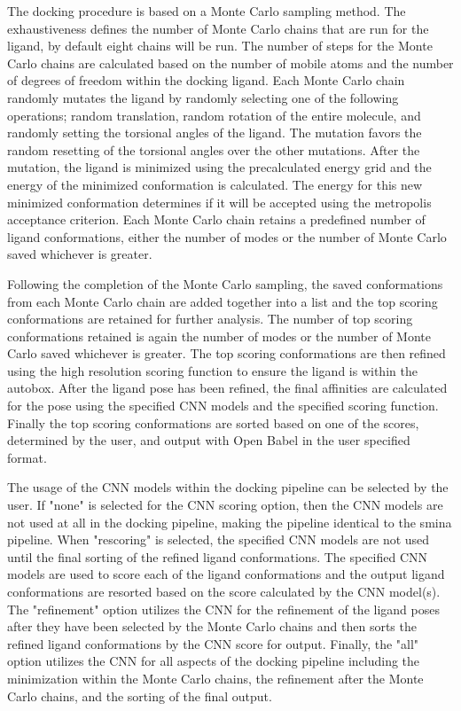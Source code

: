 \documentclass[journal=jcisd8,manuscript=article]{achemso}
\begin{document}
The docking procedure is based on a Monte Carlo sampling method. The exhaustiveness defines the number of Monte Carlo chains that are run for the ligand, by default eight chains will be run. The number of steps for the Monte Carlo chains are calculated based on the number of mobile atoms and the number of degrees of freedom within the docking ligand. Each Monte Carlo chain randomly mutates the ligand by randomly selecting one of the following operations; random translation, random rotation of the entire molecule, and randomly setting the torsional angles of the ligand. The mutation favors the random resetting of the torsional angles over the other mutations. After the mutation, the ligand is minimized using the precalculated energy grid and the energy of the minimized conformation is calculated. The energy for this new minimized conformation determines if it will be accepted using the metropolis acceptance criterion. Each Monte Carlo chain retains a predefined number of ligand conformations, either the number of modes or the number of Monte Carlo saved whichever is greater.

Following the completion of the Monte Carlo sampling, the saved conformations from each Monte Carlo chain are added together into a list and the top scoring conformations are retained for further analysis. The number of top scoring conformations retained is again the number of modes or the number of Monte Carlo saved whichever is greater. The top scoring conformations are then refined using the high resolution scoring function to ensure the ligand is within the autobox. After the ligand pose has been refined, the final affinities are calculated for the pose using the specified CNN models and the specified scoring function. Finally the top scoring conformations are sorted based on one of the scores, determined by the user, and output with Open Babel in the user specified format.

The usage of the CNN models within the docking pipeline can be selected by the user. If "none" is selected for the CNN scoring option, then the CNN models are not used at all in the docking pipeline, making the pipeline identical to the smina pipeline. When "rescoring" is selected, the specified CNN models are not used until the final sorting of the refined ligand conformations. The specified CNN models are used to score each of the ligand conformations and the output ligand conformations are resorted based on the score calculated by the CNN model(s). The "refinement" option utilizes the CNN for the refinement of the ligand poses after they have been selected by the Monte Carlo chains and then sorts the refined ligand conformations by the CNN score for output. Finally, the "all" option utilizes the CNN for all aspects of the docking pipeline including the minimization within the Monte Carlo chains, the refinement after the Monte Carlo chains, and the sorting of the final output. 
\end{document}
